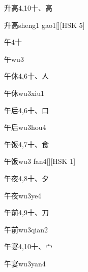 \begin{entry}{升高}{4,10}{⼗、⾼}
  \begin{phonetics}{升高}{sheng1 gao1}[][HSK 5]
  \end{phonetics}
\end{entry}

\begin{entry}{午}{4}{⼗}
  \begin{phonetics}{午}{wu3}
  \end{phonetics}
\end{entry}

\begin{entry}{午休}{4,6}{⼗、⼈}
  \begin{phonetics}{午休}{wu3xiu1}
  \end{phonetics}
\end{entry}

\begin{entry}{午后}{4,6}{⼗、⼝}
  \begin{phonetics}{午后}{wu3hou4}
  \end{phonetics}
\end{entry}

\begin{entry}{午饭}{4,7}{⼗、⾷}
  \begin{phonetics}{午饭}{wu3 fan4}[][HSK 1]
  \end{phonetics}
\end{entry}

\begin{entry}{午夜}{4,8}{⼗、⼣}
  \begin{phonetics}{午夜}{wu3ye4}
  \end{phonetics}
\end{entry}

\begin{entry}{午前}{4,9}{⼗、⼑}
  \begin{phonetics}{午前}{wu3qian2}
  \end{phonetics}
\end{entry}

\begin{entry}{午宴}{4,10}{⼗、⼧}
  \begin{phonetics}{午宴}{wu3yan4}
  \end{phonetics}
\end{entry}

